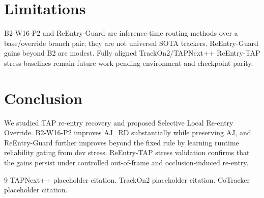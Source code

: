 \documentclass[10pt,twocolumn]{article}
\begin{document}
\section{Limitations}

B2-W16-P2 and ReEntry-Guard are inference-time routing methods over a base/override branch pair; they are not universal SOTA trackers. ReEntry-Guard gains beyond B2 are modest. Fully aligned TrackOn2/TAPNext++ ReEntry-TAP stress baselines remain future work pending environment and checkpoint parity.

\section{Conclusion}

We studied TAP re-entry recovery and proposed Selective Local Re-entry Override. B2-W16-P2 improves AJ\_RD substantially while preserving AJ, and ReEntry-Guard further improves beyond the fixed rule by learning runtime reliability gating from dev stress. ReEntry-TAP stress validation confirms that the gains persist under controlled out-of-frame and occlusion-induced re-entry.


\begin{thebibliography}{9}
 TAPNext++ placeholder citation.
 TrackOn2 placeholder citation.
 CoTracker placeholder citation.
\end{thebibliography}
\end{document}
